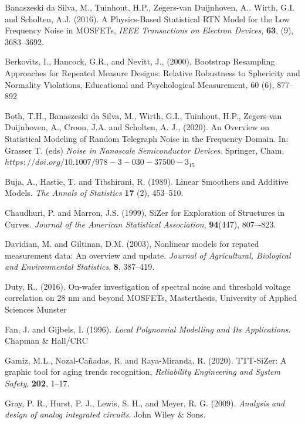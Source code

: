 \documentclass[sn-mathphys]{sn-jnl}%
\theoremstyle{thmstyleone}%
\theoremstyle{thmstyletwo}%
\theoremstyle{thmstylethree}%
\begin{document}
\begin{thebibliography}{00}
	
	 Banaszeski da Silva, M., Tuinhout, H.P., Zegers-van Duijnhoven, A..  Wirth, G.I. and Scholten, A.J. (2016). A Physics-Based Statistical RTN Model for the Low Frequency Noise in MOSFETs,  {\it IEEE Transactions on Electron Devices}, {\bf 63}, (9), 3683--3692.
	
	
	
	 Berkovits, I., Hancock, G.R., and Nevitt, J., (2000), Bootstrap Resampling Approaches for Repeated Measure Designs: Relative Robustness to Sphericity and Normality Violations, Educational and Psychological Measurement,  60 (6), 877--892 
	
	
	 Both, T.H., Banaszeski da Silva, M., Wirth, G.I., Tuinhout, H.P., Zegers-van Duijnhoven, A., Croon, J.A. and Scholten, A. J., (2020). An Overview on Statistical Modeling of Random Telegraph Noise in the Frequency Domain.  In: Grasser T. (eds) {\it Noise in Nanoscale Semiconductor Devices}. Springer, Cham. $https://doi.org/10.1007/978-3-030-37500-3_15$
	
	 Buja, A., Hastie, T. and Tibshirani, R. (1989). Linear Smoothers and Additive Models. {\it The Annals of Statistics} {\bf 17} (2), 453--510.
	
	 Chaudhuri, P. and Marron, J.S. (1999), SiZer for Exploration of Structures in Curves. {\it Journal of the American Statistical Association}, {\bf 94}(447), 807–-823.
	
	 Davidian, M. and Giltinan, D.M. (2003), Nonlinear models for repated measurement data: An overview and update. {\it Journal of Agricultural, Biological and Environmental Statistics}, {\bf 8}, 387--419. 
	
	 Duty, R.. (2016). On-wafer investigation of spectral noise and threshold voltage correlation on 28 nm and beyond MOSFETs, Masterthesis, University of Applied Sciences Munster
	
	  Fan, J. and Gijbels, I. (1996). {\it Local Polynomial Modelling and Its Applications}. Chapman \& Hall/CRC
	
	
	 Gamiz, M.L., Nozal-Ca\~nadas, R. and Raya-Miranda, R. (2020). TTT-SiZer: A graphic tool for aging trends recognition, {\it Reliability Engineering and System Safety}, {\bf 202}, 1--17.
	
 Gray, P. R., Hurst, P. J., Lewis, S. H., and Meyer, R. G. (2009). {\it Analysis and design of analog integrated circuits}. John Wiley \& Sons.


\end{thebibliography}
\end{document}
